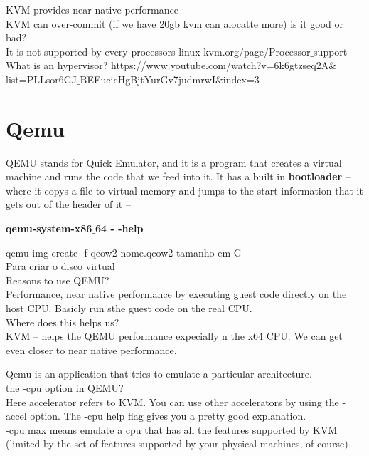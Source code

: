 \documentclass[11pt, a4paper, oneside]{article}
\theoremstyle{definition}
\begin{document}
KVM provides near native performance\\
KVM can over-commit (if we have 20gb kvm can alocatte more) is it good or bad?\\
It is not supported by every processors linux-kvm.org/page/Processor$\_$support\\

What is an hypervisor? https://www.youtube.com/watch?v=6k6gtzseq2A$\&$list=PLLsor6GJ$\_$BEEucicHgBjtYurGv7judmrwI$\&$index=3


\vfill
\pagebreak
\section{Qemu}

QEMU stands for Quick Emulator, and it is a program that creates a virtual machine and runs the code that we feed into it. It has a built in \textbf{bootloader} -- where it copys a file to virtual memory and jumps to the start information that it gets out of the header of it -- 

\Large\textbf{qemu-system-x86$\_$64 - -help}

qemu-img create -f qcow2 nome.qcow2 tamanho em G\\
Para criar o disco virtual\\

Reasons to use QEMU?\\
Performance, near native performance by executing guest code directly on the host CPU. Basicly run sthe guest code on the real CPU.\\
Where does this helps us?\\
KVM -- helps the QEMU performance expecially n the x64 CPU. We can get even closer to near native performance. 


Qemu is an application that tries to emulate a particular architecture.\\

the -cpu option in QEMU?\\

Here accelerator refers to KVM. You can use other accelerators by using the -accel option. The -cpu help flag gives you a pretty good explanation.\\

-cpu max means emulate a cpu that has all the features supported by KVM (limited by the set of features supported by your physical machines, of course)\\
\end{document}
